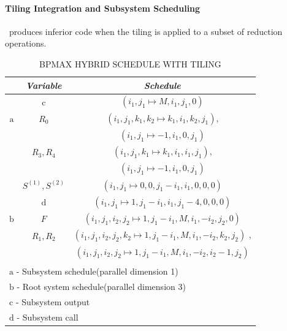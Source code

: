 \paragraph{Tiling Integration and Subsystem Scheduling}
\alphaz\ produces inferior code when the tiling is applied to a subset of reduction operations. 
\begin{table}[htbp]
\caption{\uppercase{BPMax hybrid schedule with tiling}}
\begin{center}
\begin{tabular}{|c|c|c|}
\hline
\textbf{} & \textbf{\textit{Variable}}& \textbf{\textit{Schedule}} \\
\hline
 & ${\mathrm{c}}$& $(i_{1},j_{1} \mapsto M, i_{1}, j_{1}, 0)$ \\
 \cline{2-3} 
${\mathrm{a}}$ & $R_{0}$ & $(i_{1},j_{1},k_{1},k_{2} \mapsto k_{1}, i_{1}, k_{2}, j_{1})$,    \\
 & & $(i_{1},j_{1} \mapsto -1, i_{1}, 0, j_{1})$ \\
\cline{2-3} 
& $R_{3}, R_{4}$ & $(i_{1},j_{1},k_{1} \mapsto k_{1}, i_{1}, i_{1}, j_{1})$,    \\
 & & $(i_{1},j_{1} \mapsto -1, i_{1}, 0, j_{1})$ \\
 \cline{2-3} 
\hline
& $S^{(1)}, S^{(2)}$ & $(i_{1},j_{1} \mapsto 0, 0, j_{1}-i_{1}, i_{1}, 0, 0, 0)$   \\
\cline{2-3} 
& ${\mathrm{d}}$ & $(i_{1},j_{1} \mapsto 1, j_{1}-i_{1}, i_{1}, j_{1}-4, 0, 0, 0)$   \\
\cline{2-3} 
${\mathrm{b}}$ & $F$ & $(i_{1},j_{1},i_{2},j_{2} \mapsto 1, j_{1}-i_{1}, M, i_{1}, -i_{2}, j_{2}, 0)$   \\
\cline{2-3} 
& $R_{1}, R_{2}$ & $(i_{1},j_{1},i_{2},j_{2},k_{2} \mapsto 1, j_{1}-i_{1}, M, i_{1}, -i_{2}, k_{2}, j_{2})$ ,   \\
 & & $(i_{1},j_{1},i_{2},j_{2} \mapsto 1, j_{1}-i_{1}, M, i_{1}, -i_{2}, i_{2}-1, j_{2})$ \\
\hline
\multicolumn{3}{l}{}\\
\multicolumn{3}{l}{${\mathrm{a}}$ - Subsystem schedule(parallel dimension 1)}\\
\multicolumn{3}{l}{${\mathrm{b}}$ - Root system schedule(parallel dimension 3)}\\
\multicolumn{3}{l}{${\mathrm{c}}$ - Subsystem output}\\
\multicolumn{3}{l}{${\mathrm{d}}$ - Subsystem call}\\
\end{tabular}
\label{tab:hybrid_schedule_with_tiling}
\end{center}
\end{table}
